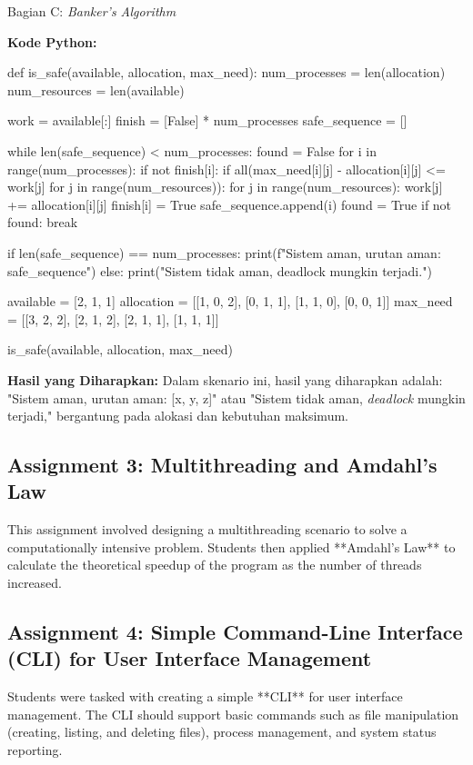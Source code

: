 \documentclass[12pt]{article}
\begin{document}
Bagian C: \textit{Banker's Algorithm}

\textbf{Kode Python:}

\begin{python}
def is_safe(available, allocation, max_need):
    num_processes = len(allocation)
    num_resources = len(available)
    
    work = available[:]
    finish = [False] * num_processes
    safe_sequence = []

    while len(safe_sequence) < num_processes:
        found = False
        for i in range(num_processes):
            if not finish[i]:
                if all(max_need[i][j] - allocation[i][j] <= work[j] for j in range(num_resources)):
                    for j in range(num_resources):
                        work[j] += allocation[i][j]
                    finish[i] = True
                    safe_sequence.append(i)
                    found = True
        if not found:
            break

    if len(safe_sequence) == num_processes:
        print(f"Sistem aman, urutan aman: {safe_sequence}")
    else:
        print("Sistem tidak aman, deadlock mungkin terjadi.")

available = [2, 1, 1]
allocation = [[1, 0, 2], [0, 1, 1], [1, 1, 0], [0, 0, 1]]
max_need = [[3, 2, 2], [2, 1, 2], [2, 1, 1], [1, 1, 1]]

is_safe(available, allocation, max_need)
\end{python}

\textbf{Hasil yang Diharapkan:} Dalam skenario ini, hasil yang diharapkan adalah: "Sistem aman, urutan aman: [x, y, z]" atau "Sistem tidak aman, \textit{deadlock} mungkin terjadi," bergantung pada alokasi dan kebutuhan maksimum.

\subsection{Assignment 3: Multithreading and Amdahl's Law}
This assignment involved designing a multithreading scenario to solve a computationally intensive problem. Students then applied **Amdahl's Law** to calculate the theoretical speedup of the program as the number of threads increased.

\subsection{Assignment 4: Simple Command-Line Interface (CLI) for User Interface Management}
Students were tasked with creating a simple **CLI** for user interface management. The CLI should support basic commands such as file manipulation (creating, listing, and deleting files), process management, and system status reporting.
\end{document}
